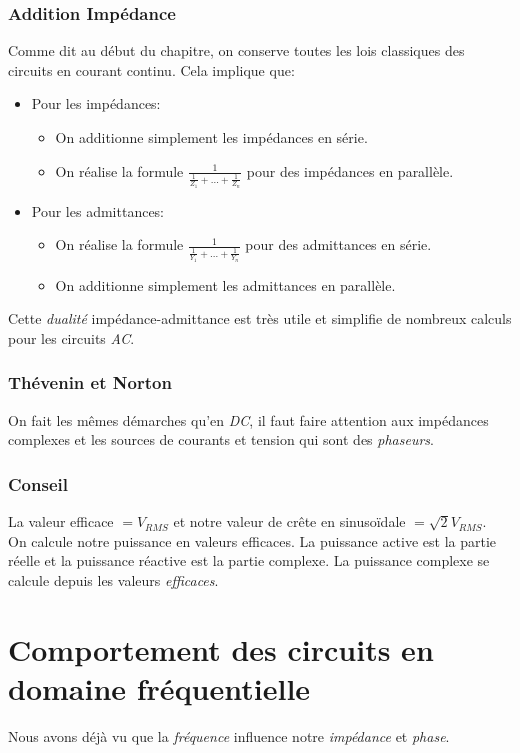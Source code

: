 \documentclass{report}
\begin{document}
\subsection{Addition Impédance}
Comme dit au début du chapitre, on conserve toutes les lois classiques des circuits en courant continu. Cela implique que:
\begin{itemize}
\item Pour les impédances:
	\begin{itemize}
	\item On additionne simplement les impédances en série.
	\item On réalise la formule $\frac{1}{\frac{1}{Z_1} + ... + \frac{1}{Z_n}}$ pour des impédances en parallèle.
	\end{itemize}
\item Pour les admittances:
	\begin{itemize}
	\item On réalise la formule $\frac{1}{\frac{1}{Y_1} + ... + \frac{1}{Y_n}}$ pour des admittances en série.
	\item On additionne simplement les admittances en parallèle.
	\end{itemize}
\end{itemize}
Cette \textit{dualité} impédance-admittance est très utile et simplifie de nombreux calculs pour les circuits \textit{AC}.

\subsection{Thévenin et Norton}
On fait les mêmes démarches qu'en \textit{DC}, il faut faire attention aux impédances complexes et les sources de courants et tension qui sont des \textit{phaseurs}.

\subsection{Conseil}
La valeur efficace $= V_{RMS}$ et notre valeur de crête en sinusoïdale $= \sqrt{2}V_{RMS}$.\\
On calcule notre puissance en valeurs efficaces. La puissance active est la partie réelle et la puissance réactive est la partie complexe. La puissance complexe se calcule depuis les valeurs \textit{efficaces}.



\chapter{Comportement des circuits en domaine fréquentielle}
Nous avons déjà vu que la \textit{fréquence} influence notre \textit{impédance} et \textit{phase}.
\end{document}
